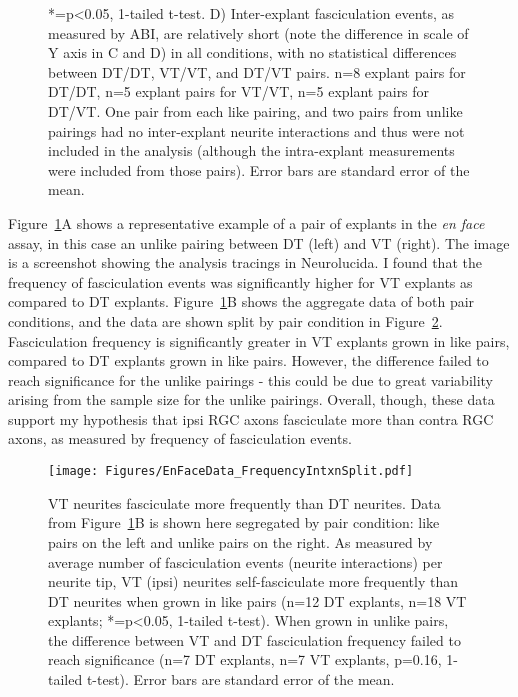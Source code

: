 \begin{figure}[hbtp]
\begin{center}
{        *=p<0.05, 1-tailed t-test.
        D) Inter-explant fasciculation events, as measured by ABI, are relatively short (note the difference in scale of Y axis in C and D) in all conditions, with no statistical differences between DT/DT, VT/VT, and DT/VT pairs.
        n=8 explant pairs for DT/DT, n=5 explant pairs for VT/VT, n=5 explant pairs for DT/VT.
        One pair from each like pairing, and two pairs from unlike pairings had no inter-explant neurite interactions and thus were not included in the analysis (although the intra-explant measurements were included from those pairs).
        Error bars are standard error of the mean.
        }
        \label{Figures/EnFaceData}
    \end{center}
\end{figure}

Figure~\ref{Figures/EnFaceData}A shows a representative example of a pair of explants in the \emph{en face} assay, in this case an unlike pairing between DT (left) and VT (right).
The image is a screenshot showing the analysis tracings in Neurolucida.
I found that the frequency of fasciculation events was significantly higher for VT explants as compared to DT explants.
Figure~\ref{Figures/EnFaceData}B shows the aggregate data of both pair conditions, and the data are shown split by pair condition in Figure~\ref{Figures/EnFaceDataFrequencyIntxnSplit}.
Fasciculation frequency is significantly greater in VT explants grown in like pairs, compared to DT explants grown in like pairs.
However, the difference failed to reach significance for the unlike pairings - this could be due to great variability arising from the sample size for the unlike pairings.
Overall, though, these data support my hypothesis that ipsi RGC axons fasciculate more than contra RGC axons, as measured by frequency of fasciculation events.
\begin{figure}[hbtp]
    \begin{center}
        \texttt{[image: Figures/EnFaceData\_FrequencyIntxnSplit.pdf]}
        \caption[VT neurites fasciculate more frequently than DT neurites.]
        {
        VT neurites fasciculate more frequently than DT neurites.
        Data from Figure~\ref{Figures/EnFaceData}B is shown here segregated by pair condition: like pairs on the left and unlike pairs on the right.
        As measured by average number of fasciculation events (neurite interactions) per neurite tip, VT (ipsi) neurites self-fasciculate more frequently than DT neurites when grown in like pairs (n=12 DT explants, n=18 VT explants; *=p<0.05, 1-tailed t-test).
        When grown in unlike pairs, the difference between VT and DT fasciculation frequency failed to reach significance (n=7 DT explants, n=7 VT explants, p=0.16, 1-tailed t-test).
        Error bars are standard error of the mean.
        }
        \label{Figures/EnFaceDataFrequencyIntxnSplit}
    \end{center}
\end{figure}

